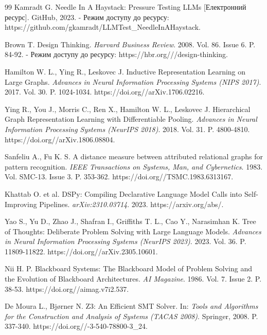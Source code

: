 \documentclass[12pt, reqno, a4paper]{amsart}
\theoremstyle{definition}
\theoremstyle{plain}
\theoremstyle{plain}
\theoremstyle{plain}
\theoremstyle{remark}
\theoremstyle{plain}
\begin{document}
{\begin{thebibliography}{99}
 Kamradt G. Needle In A Haystack: Pressure Testing LLMs [Електронний ресурс]. GitHub, 2023. - Режим доступу до ресурсу: https://github.com/\allowbreak gkamradt/\allowbreak LLMTest\_\allowbreak NeedleInAHaystack.

 Brown T. Design Thinking. \emph{Harvard Business Review}. 2008. Vol. 86. Issue 6. P. 84-92. - Режим доступу до ресурсу: https://hbr.org///\allowbreak design-thinking.

 Hamilton W. L., Ying R., Leskovec J. Inductive Representation Learning on Large Graphs. \emph{Advances in Neural Information Processing Systems (NIPS 2017)}. 2017. Vol. 30. P. 1024-1034. https://doi.org//\allowbreak arXiv.1706.02216.

 Ying R., You J., Morris C., Ren X., Hamilton W. L., Leskovec J. Hierarchical Graph Representation Learning with Differentiable Pooling. \emph{Advances in Neural Information Processing Systems (NeurIPS 2018)}. 2018. Vol. 31. P. 4800-4810. https://doi.org//\allowbreak arXiv.1806.08804.

 Sanfeliu A., Fu K. S. A distance measure between attributed relational graphs for pattern recognition. \emph{IEEE Transactions on Systems, Man, and Cybernetics}. 1983. Vol. SMC-13. Issue 3. P. 353-362. https://doi.org//\allowbreak TSMC.1983.6313167.

 Khattab O. et al. DSPy: Compiling Declarative Language Model Calls into Self-Improving Pipelines. \emph{arXiv:2310.03714}. 2023. https://arxiv.org/\allowbreak abs/.

 Yao S., Yu D., Zhao J., Shafran I., Griffiths T. L., Cao Y., Narasimhan K. Tree of Thoughts: Deliberate Problem Solving with Large Language Models. \emph{Advances in Neural Information Processing Systems (NeurIPS 2023)}. 2023. Vol. 36. P. 11809-11822. https://doi.org//\allowbreak arXiv.2305.10601.

 Nii H. P. Blackboard Systems: The Blackboard Model of Problem Solving and the Evolution of Blackboard Architectures. \emph{AI Magazine}. 1986. Vol. 7. Issue 2. P. 38-53. https://doi.org//\allowbreak aimag.v7i2.537.

 De Moura L., Bj{\o}rner N. Z3: An Efficient SMT Solver. In: \emph{Tools and Algorithms for the Construction and Analysis of Systems (TACAS 2008)}. Springer, 2008. P. 337-340. https://doi.org//-3-540-78800-3\_24.


\end{thebibliography}}
\end{document}
